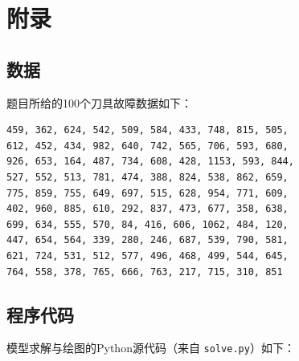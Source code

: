 \documentclass[12pt]{article}
\begin{document}
\appendix
\section{附录}
\subsection{数据}
题目所给的100个刀具故障数据如下：
\begin{verbatim}
459, 362, 624, 542, 509, 584, 433, 748, 815, 505,
612, 452, 434, 982, 640, 742, 565, 706, 593, 680,
926, 653, 164, 487, 734, 608, 428, 1153, 593, 844,
527, 552, 513, 781, 474, 388, 824, 538, 862, 659,
775, 859, 755, 649, 697, 515, 628, 954, 771, 609,
402, 960, 885, 610, 292, 837, 473, 677, 358, 638,
699, 634, 555, 570, 84, 416, 606, 1062, 484, 120,
447, 654, 564, 339, 280, 246, 687, 539, 790, 581,
621, 724, 531, 512, 577, 496, 468, 499, 544, 645,
764, 558, 378, 765, 666, 763, 217, 715, 310, 851
\end{verbatim}

\subsection{程序代码}
模型求解与绘图的Python源代码（来自 \texttt{solve.py}）如下：


\end{document}
